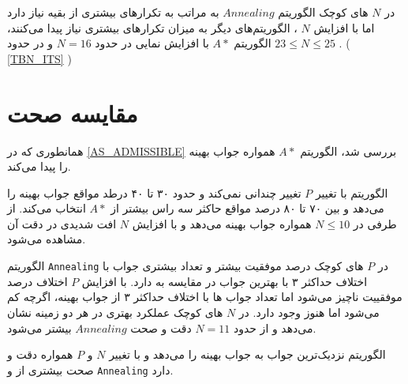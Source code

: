 در
$N$
های کوچک الگوریتم
$Annealing$
به مراتب به تکرارهای بیشتری از بقیه نیاز دارد اما با افزایش
$N$
،
 الگوریتم‌های دیگر به میزان تکرار‌های بیشتری نیاز پیدا می‌کنند،
 الگوریتم
$A*$
با افزایش نمایی
 در حدود
$N=16$
و 
در حدود
$23\leq N \leq 25$
.
(
\cref{TBN_ITS}
)

\section{مقایسه صحت}
همانطوری که در
\cref{AS_ADMISSIBLE}
بررسی شد، الگوریتم
$A*$
همواره جواب بهینه را پیدا می‌کند.

الگوریتم
با تغییر
$P$
تغییر چندانی نمی‌کند و حدود ۳۰ تا ۴۰ درطد مواقع جواب بهینه را می‌دهد و بین ۷۰ تا ۸۰ درصد مواقع حاکثر سه راس بیشتر از 
$A*$
انتخاب می‌کند. از طرفی در 
$N\leq10$
همواره جواب بهینه می‌دهد و  با افزایش 
$N$
افت شدیدی در دقت آن مشاهده می‌شود.

الگوریتم
\verb;Annealing;
در 
$P$
های کوچک  درصد موفقیت بیشتر   و تعداد بیشتری جواب با اختلاف حداکثر ۳ با  بهترین جواب 
در مقایسه به
دارد.
با افزایش 
$P$
اختلاف درصد موفقییت ناچیز می‌شود اما تعداد جواب ها با اختلاف حداکثر ۳ از جواب بهینه، اگرچه کم می‌شود اما هنوز وجود دارد.
در 
$N$
های کوچک 
عملکرد بهتری در هر دو زمینه نشان می‌دهد و از حدود
$N=11$
دقت و صحت
$Annealing$
بیشتر می‌شود.

الگوریتم
نزدیک‌ترین جواب به جواب بهینه را می‌دهد و با تغییر
$N$
و
$P$
همواره دقت و صحت بیشتری از
و
\verb;Annealing;
دارد.





